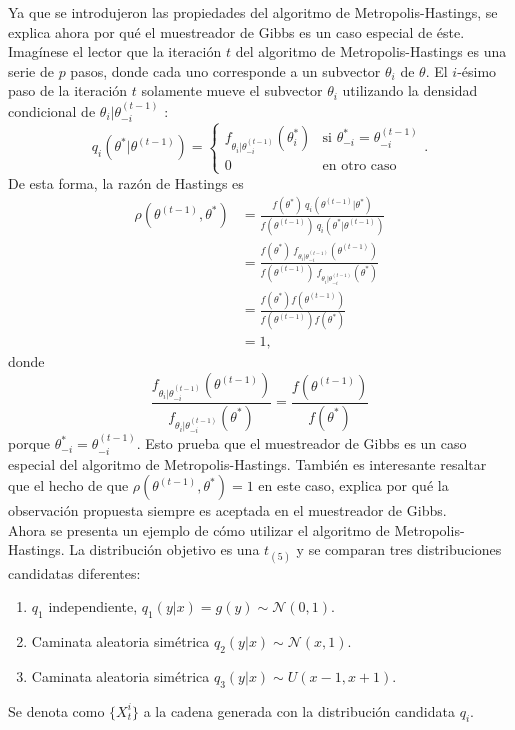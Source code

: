 \documentclass[11pt,a4paper]{article}
\begin{document}
Ya que se introdujeron las propiedades del algoritmo de Metropolis-Hastings, se explica ahora por qué el muestreador de Gibbs es un caso especial de éste. Imagínese el lector que la iteración $t$ del algoritmo de Metropolis-Hastings es una serie de $p$ pasos, donde cada uno corresponde a un subvector $\theta_i$ de $\theta$. El $i$-ésimo paso de la iteración $t$ solamente mueve el subvector $\theta_i$ utilizando la densidad condicional de $\theta_i | \theta^{(t-1)}_{-i}$ \citep{gelman}:
$$q_i(\theta^* | \theta^{(t-1)}) = \begin{cases}
f_{\theta_i | \theta_{-i}^{(t-1)}} (\theta^*_{i}) & \text{si } \theta^*_{-i} = \theta^{(t-1)}_{-i}\\
0 & \text{en otro caso} \end{cases}.$$ De esta forma, la razón de Hastings es
\begin{align*}
\rho(\theta^{(t-1)}, \theta^*) &= \frac{f(\theta^*) \ q_i(\theta^{(t-1)}|\theta^*)}{f(\theta^{(t-1)}) \ q_i(\theta^*|\theta^{(t-1)})}\\
&= \frac{f(\theta^*) \ f_{\theta_i|\theta_{-i}^{(t-1)}}(\theta^{(t-1)})}{f(\theta^{(t-1)}) \ f_{\theta_i|\theta_{-i}^{(t-1)}}(\theta^*)}\\
&= \frac{f(\theta^*)f(\theta^{(t-1)})}{f(\theta^{(t-1)})f(\theta^*)}\\
&= 1,
\end{align*}
donde $$\frac{f_{\theta_i|\theta_{-i}^{(t-1)}}(\theta^{(t-1)})}{f_{\theta_i|\theta_{-i}^{(t-1)}}(\theta^*)} = \frac{f(\theta^{(t-1)})}{f(\theta^*)}$$ porque $\theta_{-i}^* = \theta_{-i}^{(t-1)}$. Esto prueba que el muestreador de Gibbs es un caso especial del algoritmo de Metropolis-Hastings. También es interesante resaltar que el hecho de que  $\rho(\theta^{(t-1)}, \theta^*) = 1$ en este caso, explica por qué la observación propuesta siempre es aceptada en el muestreador de Gibbs.\\

Ahora se presenta un ejemplo de cómo utilizar el algoritmo de Metropolis-Hastings. La distribución objetivo es una $t_{(5)}$ y se comparan tres distribuciones candidatas diferentes:
\begin{enumerate}
\item $q_1$ independiente, $q_1(y|x) = g(y) \sim \mathcal{N}(0, 1).$
\item Caminata aleatoria simétrica $q_2(y|x) \sim \mathcal{N}(x, 1).$
\item Caminata aleatoria simétrica $q_3(y|x) \sim U(x - 1, x + 1).$
\end{enumerate}
Se denota como $\lbrace X_t^i \rbrace$ a la cadena generada con la distribución candidata $q_i$.\\
\end{document}
